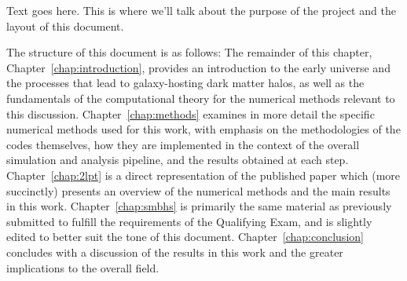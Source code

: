 
%
%
%
%


Text goes here.  This is where we'll talk about the purpose of the project and the layout of this document.

The structure of this document is as follows:  The remainder of this chapter, Chapter~\ref{chap:introduction}, provides an introduction to the early universe and the processes that lead to galaxy-hosting dark matter halos, as well as the fundamentals of the computational theory for the numerical methods relevant to this discussion.  Chapter~\ref{chap:methods} examines in more detail the specific numerical methods used for this work, with emphasis on the methodologies of the codes themselves, how they are implemented in the context of the overall simulation and analysis pipeline, and the results obtained at each step.  Chapter~\ref{chap:2lpt} is a direct representation of the published paper which (more succinctly) presents an overview of the numerical methods and the main results in this work.  Chapter~\ref{chap:smbhs} is primarily the same material as previously submitted to fulfill the requirements of the Qualifying Exam, and is slightly edited to better suit the tone of this document.  Chapter~\ref{chap:conclusion} concludes with a discussion of the results in this work and the greater implications to the overall field.




